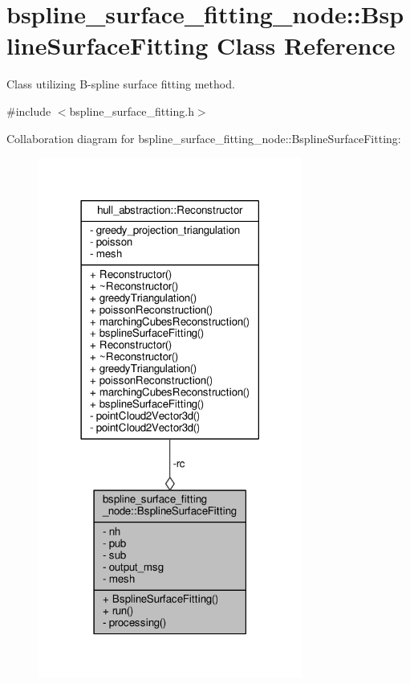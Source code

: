 \hypertarget{classbspline__surface__fitting__node_1_1_bspline_surface_fitting}{}\section{bspline\+\_\+surface\+\_\+fitting\+\_\+node\+:\+:Bspline\+Surface\+Fitting Class Reference}
\label{classbspline__surface__fitting__node_1_1_bspline_surface_fitting}


Class utilizing B-\/spline surface fitting method.  




{\ttfamily \#include $<$bspline\+\_\+surface\+\_\+fitting.\+h$>$}



Collaboration diagram for bspline\+\_\+surface\+\_\+fitting\+\_\+node\+:\+:Bspline\+Surface\+Fitting\+:\nopagebreak
\begin{figure}[H]
\begin{center}
\leavevmode
\includegraphics[width=246pt]{classbspline__surface__fitting__node_1_1_bspline_surface_fitting__coll__graph}
\end{center}
\end{figure}
